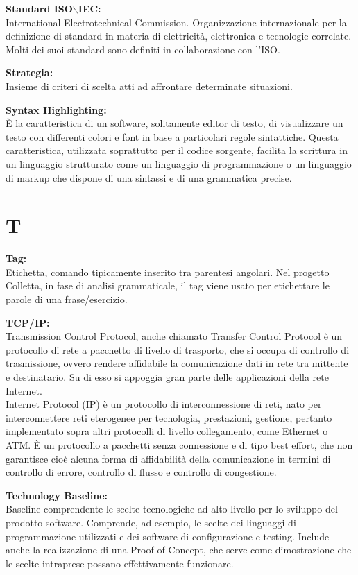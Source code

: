 \documentclass[a4paper, oneside, openany, dvipsnames, table]{article}
\begin{document}
\textbf{Standard ISO$\backslash$IEC:}\\	International Electrotechnical Commission. Organizzazione internazionale per la definizione di standard in materia di elettricità, elettronica e tecnologie correlate. Molti dei suoi standard sono definiti in collaborazione con l'ISO.

\textbf{Strategia:}\\Insieme di criteri di scelta atti ad affrontare determinate situazioni.

\textbf{Syntax Highlighting:}\\	\`E la caratteristica di un software, 
solitamente editor di testo, di visualizzare un testo con differenti colori e font in base a particolari 
regole sintattiche. Questa caratteristica, utilizzata soprattutto per il codice sorgente, facilita la scrittura 
in un linguaggio strutturato come un linguaggio di programmazione o un linguaggio di markup che dispone di una 
sintassi e di una grammatica precise.
 
\newpage
\section{T}
\textbf{Tag:}\\	Etichetta, comando tipicamente inserito tra parentesi angolari. Nel progetto Colletta, in fase di analisi grammaticale, il tag viene usato per etichettare le parole di una frase/esercizio. 

\textbf{TCP/IP:}\\	Transmission Control Protocol, anche chiamato Transfer Control Protocol è un protocollo di rete a pacchetto di livello di trasporto, che si occupa di controllo di trasmissione, ovvero rendere affidabile la comunicazione dati in rete tra mittente e destinatario. Su di esso si appoggia gran parte delle applicazioni della rete Internet.
\\	Internet Protocol (IP) è un protocollo di interconnessione di reti, nato per interconnettere reti eterogenee per tecnologia, prestazioni, gestione, pertanto implementato sopra altri protocolli di livello collegamento, come Ethernet o ATM. \`E un protocollo a pacchetti  senza connessione e di tipo best effort, che non garantisce cioè alcuna forma di affidabilità della comunicazione in termini di controllo di errore, controllo di flusso e controllo di congestione.

 \textbf{Technology Baseline:} \\Baseline comprendente le scelte tecnologiche ad alto livello per lo sviluppo 
 del prodotto software. Comprende, ad esempio, le scelte dei linguaggi di programmazione utilizzati e dei 
 software di configurazione e testing. Include anche la realizzazione di una Proof of Concept, che serve 
 come dimostrazione che le scelte intraprese possano effettivamente funzionare.
 
\end{document}
